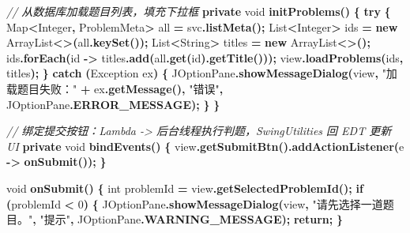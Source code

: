 \documentclass[
  11pt,
]{ctexart}
\newenvironment{Shaded}{\begin{snugshade}}{\end{snugshade}}
\newcommand{\BuiltInTok}[1]{#1}
\newcommand{\CommentTok}[1]{\textcolor[rgb]{0.56,0.35,0.01}{\textit{#1}}}
\newcommand{\ControlFlowTok}[1]{\textcolor[rgb]{0.13,0.29,0.53}{\textbf{#1}}}
\newcommand{\DataTypeTok}[1]{\textcolor[rgb]{0.13,0.29,0.53}{#1}}
\newcommand{\DecValTok}[1]{\textcolor[rgb]{0.00,0.00,0.81}{#1}}
\newcommand{\FunctionTok}[1]{\textcolor[rgb]{0.13,0.29,0.53}{\textbf{#1}}}
\newcommand{\KeywordTok}[1]{\textcolor[rgb]{0.13,0.29,0.53}{\textbf{#1}}}
\newcommand{\NormalTok}[1]{#1}
\newcommand{\OperatorTok}[1]{\textcolor[rgb]{0.81,0.36,0.00}{\textbf{#1}}}
\newcommand{\StringTok}[1]{\textcolor[rgb]{0.31,0.60,0.02}{#1}}
\begin{document}
\begin{Shaded}
\begin{Highlighting}[]
    \CommentTok{// 从数据库加载题目列表，填充下拉框}
    \KeywordTok{private} \DataTypeTok{void} \FunctionTok{initProblems}\OperatorTok{()} \OperatorTok{\{}
        \ControlFlowTok{try} \OperatorTok{\{}
            \BuiltInTok{Map}\OperatorTok{\textless{}}\BuiltInTok{Integer}\OperatorTok{,}\NormalTok{ ProblemMeta}\OperatorTok{\textgreater{}}\NormalTok{ all }\OperatorTok{=}\NormalTok{ svc}\OperatorTok{.}\FunctionTok{listMeta}\OperatorTok{();}
            \BuiltInTok{List}\OperatorTok{\textless{}}\BuiltInTok{Integer}\OperatorTok{\textgreater{}}\NormalTok{ ids    }\OperatorTok{=} \KeywordTok{new} \BuiltInTok{ArrayList}\OperatorTok{\textless{}\textgreater{}(}\NormalTok{all}\OperatorTok{.}\FunctionTok{keySet}\OperatorTok{());}
            \BuiltInTok{List}\OperatorTok{\textless{}}\BuiltInTok{String}\OperatorTok{\textgreater{}}\NormalTok{  titles }\OperatorTok{=} \KeywordTok{new} \BuiltInTok{ArrayList}\OperatorTok{\textless{}\textgreater{}();}
\NormalTok{            ids}\OperatorTok{.}\FunctionTok{forEach}\OperatorTok{(}\NormalTok{id }\OperatorTok{{-}\textgreater{}}\NormalTok{ titles}\OperatorTok{.}\FunctionTok{add}\OperatorTok{(}\NormalTok{all}\OperatorTok{.}\FunctionTok{get}\OperatorTok{(}\NormalTok{id}\OperatorTok{).}\FunctionTok{getTitle}\OperatorTok{()));}
\NormalTok{            view}\OperatorTok{.}\FunctionTok{loadProblems}\OperatorTok{(}\NormalTok{ids}\OperatorTok{,}\NormalTok{ titles}\OperatorTok{);}
        \OperatorTok{\}} \ControlFlowTok{catch} \OperatorTok{(}\BuiltInTok{Exception}\NormalTok{ ex}\OperatorTok{)} \OperatorTok{\{}
            \BuiltInTok{JOptionPane}\OperatorTok{.}\FunctionTok{showMessageDialog}\OperatorTok{(}\NormalTok{view}\OperatorTok{,}
                \StringTok{"加载题目失败："} \OperatorTok{+}\NormalTok{ ex}\OperatorTok{.}\FunctionTok{getMessage}\OperatorTok{(),} \StringTok{"错误"}\OperatorTok{,}
                \BuiltInTok{JOptionPane}\OperatorTok{.}\FunctionTok{ERROR\_MESSAGE}\OperatorTok{);}
        \OperatorTok{\}}
    \OperatorTok{\}}

    \CommentTok{// 绑定提交按钮：Lambda {-}\textgreater{} 后台线程执行判题，SwingUtilities 回 EDT 更新 UI}
    \KeywordTok{private} \DataTypeTok{void} \FunctionTok{bindEvents}\OperatorTok{()} \OperatorTok{\{}
\NormalTok{        view}\OperatorTok{.}\FunctionTok{getSubmitBtn}\OperatorTok{().}\FunctionTok{addActionListener}\OperatorTok{(}\NormalTok{e }\OperatorTok{{-}\textgreater{}} \FunctionTok{onSubmit}\OperatorTok{());}
    \OperatorTok{\}}

    \DataTypeTok{void} \FunctionTok{onSubmit}\OperatorTok{()} \OperatorTok{\{}
        \DataTypeTok{int}\NormalTok{ problemId }\OperatorTok{=}\NormalTok{ view}\OperatorTok{.}\FunctionTok{getSelectedProblemId}\OperatorTok{();}
        \ControlFlowTok{if} \OperatorTok{(}\NormalTok{problemId }\OperatorTok{\textless{}} \DecValTok{0}\OperatorTok{)} \OperatorTok{\{}
            \BuiltInTok{JOptionPane}\OperatorTok{.}\FunctionTok{showMessageDialog}\OperatorTok{(}\NormalTok{view}\OperatorTok{,} \StringTok{"请先选择一道题目。"}\OperatorTok{,}
                \StringTok{"提示"}\OperatorTok{,} \BuiltInTok{JOptionPane}\OperatorTok{.}\FunctionTok{WARNING\_MESSAGE}\OperatorTok{);}
            \ControlFlowTok{return}\OperatorTok{;}
        \OperatorTok{\}}


\end{Highlighting}
\end{Shaded}
\end{document}
